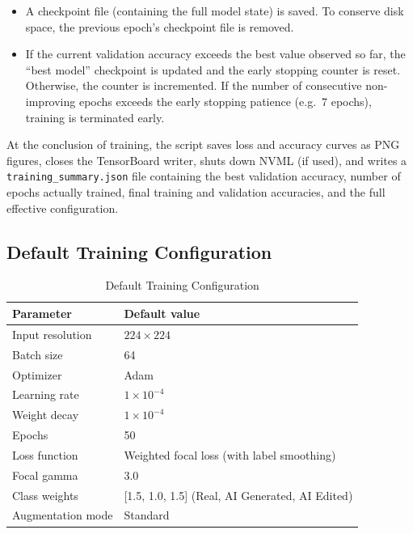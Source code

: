 \begin{enumerate}
  \begin{itemize}
    \item A checkpoint file (containing the full model state) is saved. To conserve disk space, the previous epoch's checkpoint file is removed.
    \item If the current validation accuracy exceeds the best value observed so far, the ``best model'' checkpoint is updated and the early stopping counter is reset. Otherwise, the counter is incremented. If the number of consecutive non-improving epochs exceeds the early stopping patience (e.g.\ 7 epochs), training is terminated early.
  \end{itemize}
\end{enumerate}

At the conclusion of training, the script saves loss and accuracy curves as PNG figures, closes the TensorBoard writer, shuts down NVML (if used), and writes a \texttt{training\_summary.json} file containing the best validation accuracy, number of epochs actually trained, final training and validation accuracies, and the full effective configuration.

\subsection{Default Training Configuration}
\label{sec:default-training-configuration}

\begin{table}[htbp]
  \centering
  \caption{Default Training Configuration}
  \label{tab:default-training-configuration}
  \begin{tabular}{ll}
    \toprule
    Parameter & Default value \\
    \midrule
    Input resolution & $224 \times 224$ \\
    Batch size & 64 \\
    Optimizer & Adam \\
    Learning rate & $1 \times 10^{-4}$ \\
    Weight decay & $1 \times 10^{-4}$ \\
    Epochs & 50 \\
    Loss function & Weighted focal loss (with label smoothing) \\
    Focal gamma & 3.0 \\
    Class weights & [1.5, 1.0, 1.5] (Real, AI Generated, AI Edited) \\
    Augmentation mode & Standard \\
    \bottomrule
  \end{tabular}
\end{table}


